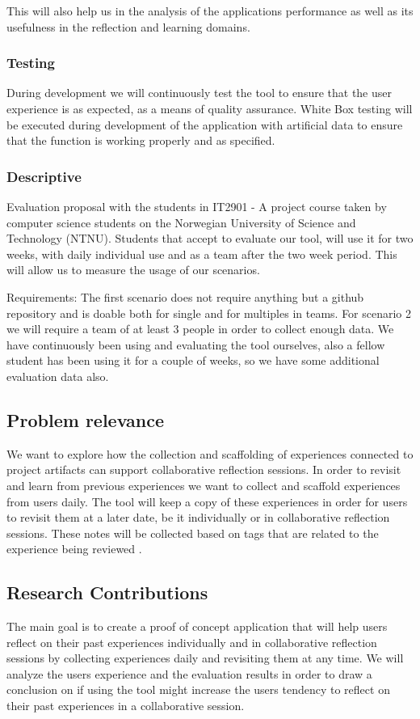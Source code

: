 This will also help us in the analysis of the applications performance as well as its usefulness in the reflection and learning domains.

\subsubsection{Testing}
During development we will continuously test the tool to ensure that the user experience is as expected, as a means of quality assurance.
White Box testing will be executed during development of the application with artificial data to ensure that the function is working properly and as specified. 

\subsubsection{Descriptive}
Evaluation proposal with the students in IT2901 - A project course taken by computer science students on the Norwegian University of Science and Technology (NTNU). 
Students that accept to evaluate our tool, will use it for two weeks, with daily individual use and as a team after the two week period. This will allow us to measure the usage of our scenarios. 

Requirements: 
The first scenario does not require anything but a github repository and is doable both for single and for multiples in teams.
For scenario 2 we will require a team of at least 3 people in order to collect enough data. 
We have continuously been using and evaluating the tool ourselves, also a fellow student has been using it for a couple of weeks, so we have some additional evaluation
data also.


\subsection{Problem relevance}
We want to explore how the collection and scaffolding of experiences connected to project artifacts can support collaborative reflection sessions. In order to revisit and learn from previous experiences we want to collect and scaffold experiences from users daily. The tool will keep a copy of these experiences in order for users to revisit them at a later date, be it individually or in collaborative reflection sessions. These notes will be collected based on tags that are related to the experience being reviewed \cite{Hassan-montero2006}.

\subsection{Research Contributions}
The main goal is to create a proof of concept application that will help users reflect on their past experiences individually and in collaborative reflection sessions by collecting experiences daily and revisiting them at any time. We will analyze the users experience and the evaluation results in order to draw a conclusion on if using the tool might increase the users tendency to reflect on their past experiences in a collaborative session.

